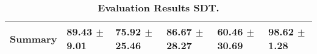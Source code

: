 \begin{table}[htb]
{\begin{tabular}{llllll}
\midrule
\textbf{Summary                                  } &        \phantom{0}89.43 $\pm$ \phantom{0}9.01 &                      \phantom{0}75.92 $\pm$ 25.46 &                  \phantom{0}86.67 $\pm$ 28.27 &            \phantom{0}60.46 $\pm$ 30.69 &  \phantom{0}98.62 $\pm$ \phantom{0}1.28 \\
\bottomrule
\end{tabular}%
}
\caption{\textbf{Evaluation Results SDT.}}
\label{tab:eval-results}
\end{table}
\newpage 
